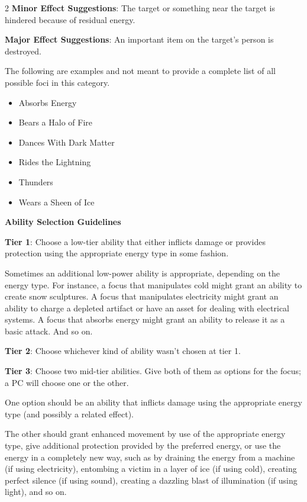 \begin{multicols}{2}
\textbf{Minor Effect Suggestions}: The target or something near the target is hindered because of residual energy.

\textbf{Major Effect Suggestions}: An important item on the target’s person is destroyed.

The following are examples and not meant to provide a complete list of all possible foci in this category.

\begin{itemize} 
\item Absorbs Energy
\item Bears a Halo of Fire
\item Dances With Dark Matter
\item Rides the Lightning
\item Thunders
\item Wears a Sheen of Ice
\end{itemize}

\textbf{Ability Selection Guidelines}

\textbf{Tier 1}: Choose a low-tier ability that either inflicts damage or provides protection using the appropriate energy type in some fashion.

Sometimes an additional low-power ability is appropriate, depending on the energy type. For instance, a focus that manipulates cold might grant an ability to create snow sculptures. A focus that manipulates electricity might grant an ability to charge a depleted artifact or have an asset for dealing with electrical systems. A focus that absorbs energy might grant an ability to release it as a basic attack. And so on.

\textbf{Tier 2}: Choose whichever kind of ability wasn’t chosen at tier 1. 

\textbf{Tier 3}: Choose two mid-tier abilities. Give both of them as options for the focus; a PC will choose one or the other.

One option should be an ability that inflicts damage using the appropriate energy type (and possibly a related effect).

The other should grant enhanced movement by use of the appropriate energy type, give additional protection provided by the preferred energy, or use the energy in a completely new way, such as by draining the energy from a machine (if using electricity), entombing a victim in a layer of ice (if using cold), creating perfect silence (if using sound), creating a dazzling blast of illumination (if using light), and so on.


\end{multicols}
